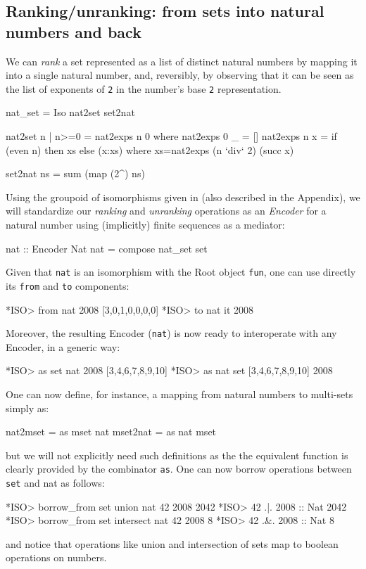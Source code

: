 \documentclass[]{INCLUDES/llncs}
\begin{document}
\subsection{Ranking/unranking: from sets into natural numbers and back}
\label{natset} We can {\em rank} a set represented as a list of distinct
natural numbers by mapping it into a single natural number,
and, reversibly, by observing that it can be seen
as the list of exponents of {\tt 2} in the number's
base {\tt 2} representation.

\begin{code}
nat_set = Iso nat2set set2nat 

nat2set n | n>=0 = nat2exps n 0 where
  nat2exps 0 _ = []
  nat2exps n x = if (even n) then xs else (x:xs) where
    xs=nat2exps (n `div` 2) (succ x)

set2nat ns = sum (map (2^) ns)
\end{code}

Using the groupoid of isomorphisms given in \cite{sac09fISO} (also described in
the Appendix), we will standardize our {\em ranking} and {\em unranking}
operations as an {\em Encoder} for a natural number using (implicitly)
finite sequences as a mediator:
\begin{code}
nat :: Encoder Nat
nat = compose nat_set set
\end{code}
Given that {\tt nat} is an isomorphism with the Root object {\tt fun}, one can
use directly its {\tt from} and {\tt to} components:
\begin{codex}
*ISO> from nat 2008
[3,0,1,0,0,0,0]
*ISO> to nat it
2008
\end{codex}
Moreover, the resulting Encoder ({\tt nat}) is now ready to interoperate 
with any Encoder, in a generic way:
\begin{codex}
*ISO> as set nat 2008
[3,4,6,7,8,9,10]
*ISO> as nat set [3,4,6,7,8,9,10]
2008
\end{codex}
One can now define, for instance, a mapping from natural numbers to multi-sets
simply as:
\begin{code}
nat2mset = as mset nat
mset2nat = as nat mset 
\end{code}
but we will not explicitly need such definitions as the the equivalent
function is clearly provided by the combinator {\tt as}.
One can now borrow operations between {\tt set} and {nat} as follows:
\begin{codex}
*ISO> borrow_from set union nat 42 2008
2042
*ISO> 42 .|. 2008 :: Nat
2042
*ISO> borrow_from set intersect nat 42 2008
8
*ISO> 42 .&. 2008 :: Nat
8
\end{codex}
and notice that operations like union and intersection of sets map to boolean
operations on numbers.
\end{document}
